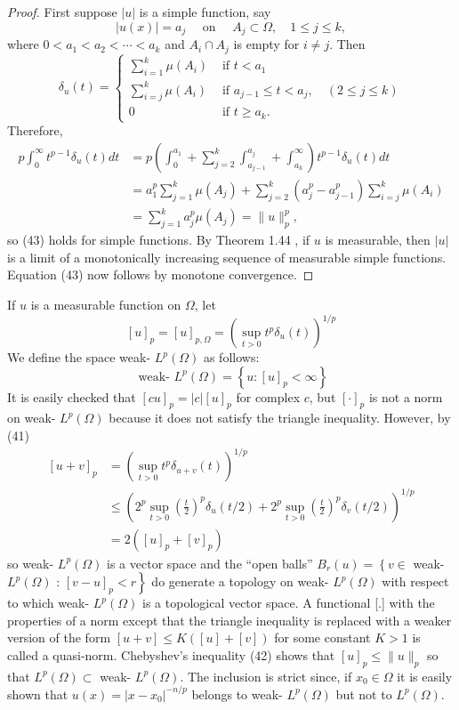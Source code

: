\begin{proof}
  First suppose $|u|$ is a simple function, say
  \[
  |u(x)|=a_j \quad \text { on } \quad A_j \subset \Omega, \quad 1 \leq j \leq k,
  \]
  where $0<a_1<a_2<\cdots<a_k$ and $A_i \cap A_j$ is empty for $i \neq j$. Then
  \[
 \delta_u(t)= \begin{cases}\sum_{i=1}^k \mu\left(A_i\right) & \text { if } t<a_1 \\ \sum_{i=j}^k \mu\left(A_i\right) & \text { if } a_{j-1} \leq t<a_j, \quad(2 \leq j \leq k) \\ 0 & \text { if } t \geq a_k .\end{cases}
  \]
  Therefore,
  \[
  \begin{aligned}
  p \int_0^{\infty} t^{p-1} \delta_u(t) d t & =p\left(\int_0^{a_1}+\sum_{j=2}^k \int_{a_{j-1}}^{a_j}+\int_{a_k}^{\infty}\right) t^{p-1} \delta_u(t) d t \\
  & =a_1^p \sum_{j=1}^k \mu\left(A_j\right)+\sum_{j=2}^k\left(a_j^p-a_{j-1}^p\right) \sum_{i=j}^k \mu\left(A_i\right) \\
  & =\sum_{j=1}^k a_j^p \mu\left(A_j\right)=\|u\|_p^p,
  \end{aligned}
  \]
  so (43) holds for simple functions. By Theorem 1.44 , if $u$ is measurable, then $|u|$ is a limit of a monotonically increasing sequence of measurable simple functions. Equation (43) now follows by monotone convergence.
\end{proof}


\begin{para}
  If $u$ is a measurable function on $\Omega$, let
  \[
  [u]_p=[u]_{p, \Omega}=\left(\sup _{t>0} t^p \delta_u(t)\right)^{1 / p}
  \]
  We define the space weak- $L^p(\Omega)$ as follows:
  \[
  \text { weak- } L^p(\Omega)=\left\{u:[u]_p<\infty\right\}
  \]
  It is easily checked that $[c u]_p=|c|[u]_p$ for complex $c$, but $[\cdot]_p$ is not a norm on weak- $L^p(\Omega)$ because it does not satisfy the triangle inequality. However, by (41)
  \[
  \begin{aligned}
  {[u+v]_p } & =\left(\sup _{t>0} t^p \delta_{u+v}(t)\right)^{1 / p} \\
  & \leq\left(2^p \sup _{t>0}\left(\frac{t}{2}\right)^p \delta_u(t / 2)+2^p \sup _{t>0}\left(\frac{t}{2}\right)^p \delta_v(t / 2)\right)^{1 / p} \\
  & =2\left([u]_p+[v]_p\right)
  \end{aligned}
  \]
  so weak- $L^p(\Omega)$ is a vector space and the ``open balls'' $B_r(u)=\left\{v \in\right.$ weak- $L^p(\Omega)$ : $\left.[v-u]_p<r\right\}$ do generate a topology on weak- $L^p(\Omega)$ with respect to which weak- $L^p(\Omega)$ is a topological vector space. A functional [.] with the properties of a norm except that the triangle inequality is replaced with a weaker version of the form $[u+v] \leq K([u]+[v])$ for some constant $K>1$ is called a quasi-norm.
  Chebyshev's inequality (42) shows that $[u]_p \leq\|u\|_p$ so that $L^p(\Omega) \subset$ weak- $L^p(\Omega)$. The inclusion is strict since, if $x_0 \in \Omega$ it is easily shown that $u(x)=\left|x-x_0\right|^{-n / p}$ belongs to weak- $L^p(\Omega)$ but not to $L^p(\Omega)$.
\end{para}

